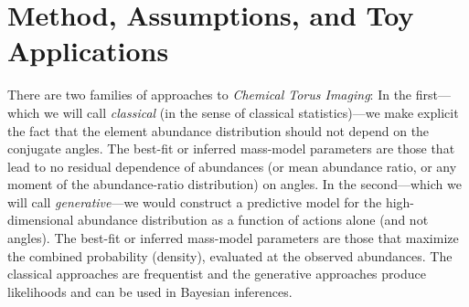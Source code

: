 \documentclass[modern]{aastex63}
\newcommand{\methodname}{\textsl{Chemical Torus Imaging}}
\begin{document}
\section{Method, Assumptions, and Toy Applications}
\label{sec:inferences}

There are two families of approaches to \methodname:
In the first---which we will call \emph{classical} (in the sense of classical
statistics)---we make explicit the fact that the element abundance distribution
should not depend on the conjugate angles.
The best-fit or inferred mass-model parameters are those that lead to no
residual dependence of abundances (or mean abundance ratio, or any moment of the
abundance-ratio distribution) on angles.
In the second---which we will call \emph{generative}---we would construct a
predictive model for the high-dimensional abundance distribution as a function
of actions alone (and not angles).
The best-fit or inferred mass-model parameters are those that maximize the
combined probability (density), evaluated at the observed abundances.
The classical approaches are frequentist and the generative approaches produce
likelihoods and can be used in Bayesian inferences.
\end{document}
